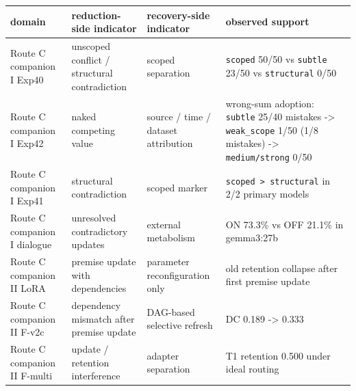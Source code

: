 \documentclass[12pt,a4paper]{article}
\begin{document}
{\def\LTcaptype{table} %
\begin{longtable}[]{@{}
  >{\raggedright\arraybackslash}p{}
  >{\raggedright\arraybackslash}p{}
  >{\raggedright\arraybackslash}p{}
  >{\raggedright\arraybackslash}p{}@{}}
\toprule\noalign{}
\begin{minipage}[b]{\linewidth}\raggedright
domain
\end{minipage} & \begin{minipage}[b]{\linewidth}\raggedright
reduction-side indicator
\end{minipage} & \begin{minipage}[b]{\linewidth}\raggedright
recovery-side indicator
\end{minipage} & \begin{minipage}[b]{\linewidth}\raggedright
observed support
\end{minipage} \\
\midrule\noalign{}
\endhead
\bottomrule\noalign{}
\endlastfoot
Route C companion I Exp40 & unscoped conflict / structural contradiction & scoped separation & \texttt{scoped} 50/50 vs \texttt{subtle} 23/50 vs \texttt{structural} 0/50 \\
Route C companion I Exp42 & naked competing value & source / time / dataset attribution & wrong-sum adoption: \texttt{subtle} 25/40 mistakes -\textgreater{} \texttt{weak\_scope} 1/50 (1/8 mistakes) -\textgreater{} \texttt{medium/strong} 0/50 \\
Route C companion I Exp41 & structural contradiction & scoped marker & \texttt{scoped\ \textgreater{}\ structural} in 2/2 primary models \\
Route C companion I dialogue & unresolved contradictory updates & external metabolism & ON 73.3\% vs OFF 21.1\% in gemma3:27b \\
Route C companion II LoRA & premise update with dependencies & parameter reconfiguration only & old retention collapse after first premise update \\
Route C companion II F-v2c & dependency mismatch after premise update & DAG-based selective refresh & DC 0.189 -\textgreater{} 0.333 \\
Route C companion II F-multi & update / retention interference & adapter separation & T1 retention 0.500 under ideal routing \\
\end{longtable}
}
\end{document}
